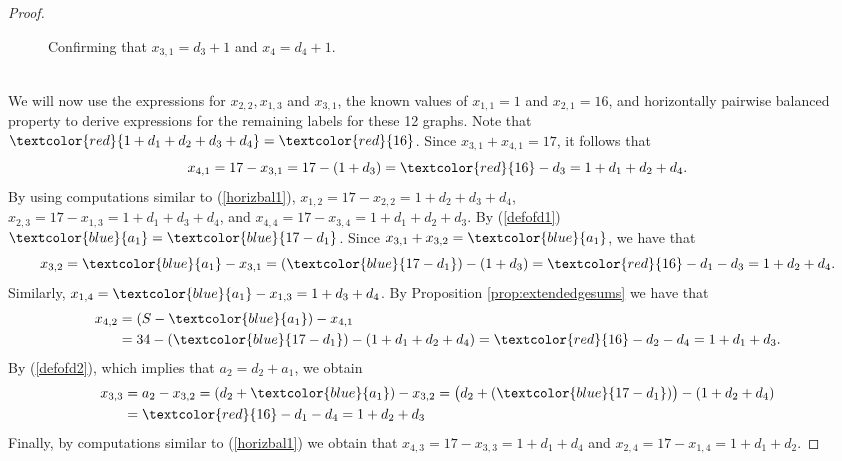 \documentclass[10pt, reqno]{amsart}
\theoremstyle{definition}
\theoremstyle{plain}
\begin{document}
\begin{proof}
\begin{figure}[hbt!]
\caption{Confirming that $x_{3,1}=d_3+1$ and $x_4=d_4+1$.}\label{confirmd_3}
\end{figure}
\hspace{2in}\\
We will now use the expressions for $x_{2,2}, x_{1,3}$ and $x_{3,1}$, the known values of $x_{1,1}=1$ and $x_{2,1}=16$, and horizontally pairwise balanced property to derive expressions for the remaining labels for these 12 graphs. Note that $\textcolor{red}{1+d_1+d_2+d_3+d_4}=\textcolor{red}{16}$. Since $x_{3,1}+x_{4,1}=17$, it follows that 
\begin{equation}\label{horizbal1}
  x_{4,1}=17-x_{3,1}=17-( 1+d_3)= \textcolor{red}{16}- d_3 =1+d_1+d_2+d_4.  
\end{equation}
By using computations similar to (\ref{horizbal1}), 
$x_{1,2}=17-x_{2,2}=1+d_2+d_3+d_4$,\\  $x_{2,3}=17-x_{1,3}=1+d_1+d_3+d_4$, and
$x_{4,4}=17-x_{3,4}=1+d_1+d_2+d_3$. By (\ref{defofd1}) $\textcolor{blue}{a_1}=\textcolor{blue}{17-d_1}$. Since $x_{3,1}+x_{3,2}=\textcolor{blue}{a_1}$, we have that
\begin{equation*}
    x_{3,2}=\textcolor{blue}{a_1}-x_{3,1}=(\textcolor{blue}{17-d_1})-(1+d_3)=\textcolor{red}{16}-d_1-d_3=1+d_2+d_4.
\end{equation*}
Similarly, $x_{1,4}=\textcolor{blue}{a_1}-x_{1,3}=1+d_3+d_4$. By Proposition \ref{prop:extendedgesums} we have that
\begin{align*}
    x_{4,2}&=(S-\textcolor{blue}{a_1})-x_{4,1}\\
           &=34-(\textcolor{blue}{17-d_1})-(1+d_1+d_2+d_4)=\textcolor{red}{16}-d_2-d_4=1+d_1+d_3.
\end{align*}
By  (\ref{defofd2}), which implies that $a_2=d_2+a_1$, we obtain
\begin{align*}
     x_{3,3}&=a_2-x_{3,2}=(d_2+\textcolor{blue}{a_1})-x_{3,2}
        =\big(d_2+(\textcolor{blue}{17-d_1})\big)-(1+d_2+d_4)\\
        &=\textcolor{red}{16}-d_1-d_4= 1+d_2+d_3
\end{align*}
Finally, by computations similar to (\ref{horizbal1}) we obtain that
$x_{4,3}=17-x_{3,3}=1+d_1+d_4$ and $x_{2,4}=17-x_{1,4}=1+d_1+d_2$.
\end{proof}
\end{document}
